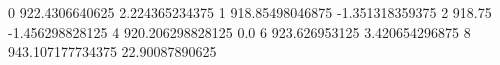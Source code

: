 0 922.4306640625 2.224365234375
1 918.85498046875 -1.351318359375
2 918.75 -1.456298828125
4 920.206298828125 0.0
6 923.626953125 3.420654296875
8 943.107177734375 22.90087890625
